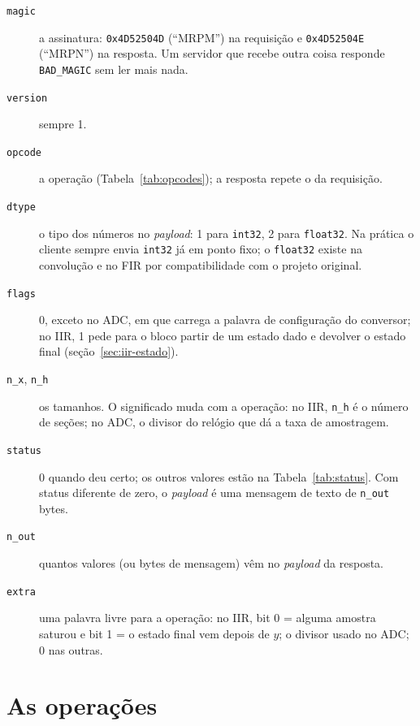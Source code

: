\begin{description}
  \item[\texttt{magic}] a assinatura: \texttt{0x4D52504D} (``MRPM'') na
    requisição e \texttt{0x4D52504E} (``MRPN'') na resposta. Um servidor que
    recebe outra coisa responde \texttt{BAD\_MAGIC} sem ler mais nada.
  \item[\texttt{version}] sempre 1.
  \item[\texttt{opcode}] a operação (Tabela~\ref{tab:opcodes}); a resposta
    repete o da requisição.
  \item[\texttt{dtype}] o tipo dos números no \emph{payload}: 1 para
    \texttt{int32}, 2 para \texttt{float32}. Na prática o cliente sempre envia
    \texttt{int32} já em ponto fixo; o \texttt{float32} existe na convolução e
    no FIR por compatibilidade com o projeto original.
  \item[\texttt{flags}] 0, exceto no ADC, em que carrega a palavra de
    configuração do conversor; no IIR, 1 pede para o bloco partir de um
    estado dado e devolver o estado final (seção~\ref{sec:iir-estado}).
  \item[\texttt{n\_x}, \texttt{n\_h}] os tamanhos. O significado muda com a
    operação: no IIR, \texttt{n\_h} é o número de seções; no ADC, o divisor do
    relógio que dá a taxa de amostragem.
  \item[\texttt{status}] 0 quando deu certo; os outros valores estão na
    Tabela~\ref{tab:status}. Com status diferente de zero, o \emph{payload} é
    uma mensagem de texto de \texttt{n\_out} bytes.
  \item[\texttt{n\_out}] quantos valores (ou bytes de mensagem) vêm no
    \emph{payload} da resposta.
  \item[\texttt{extra}] uma palavra livre para a operação: no IIR, bit 0 = alguma
    amostra saturou e bit 1 = o estado final vem depois de \(y\); o divisor usado
    no ADC; 0 nas outras.
\end{description}

\section{As operações}


